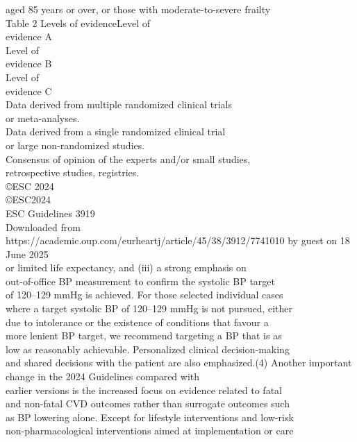 \documentclass[bs, english]{stthesis}
\begin{document}
aged  85  years  or  over,  or  those  with  moderate-to-severe  frailty\\
Table 2  Levels of evidenceLevel of\\
evidence A\\
Level of\\
evidence B\\
Level of\\
evidence C\\
Data derived from multiple randomized clinical trials\\
or meta-analyses.\\
Data derived from a single randomized clinical trial\\
or large non-randomized studies.\\
Consensus of opinion of the experts and/or small studies,\\
retrospective studies, registries.\\
©ESC 2024\\
©ESC2024\\
ESC     Guidelines    3919\\
Downloaded from https://academic.oup.com/eurheartj/article/45/38/3912/7741010 by guest on 18 June 2025\\
or  limited  life  expectancy,  and  (iii)  a  strong  emphasis  on\\
out-of-office  BP  measurement  to  confirm  the  systolic  BP  target\\
of 120–129 mmHg is achieved. For those selected individual cases\\
where a target systolic BP of 120–129 mmHg is not pursued, either\\
due  to  intolerance  or  the  existence  of  conditions  that  favour  a\\
more  lenient  BP  target,  we  recommend  targeting  a  BP  that  is  as\\
low as reasonably achievable. Personalized clinical decision-making\\
and shared decisions with the patient are also emphasized.(4) Another  important  change  in  the  2024  Guidelines  compared  with\\
earlier  versions  is  the  increased  focus  on  evidence  related  to  fatal\\
and non-fatal CVD outcomes  rather  than surrogate outcomes  such\\
as  BP  lowering  alone.  Except  for  lifestyle  interventions  and  low-risk\\
non-pharmacological interventions aimed at  implementation or  care\\
\end{document}

